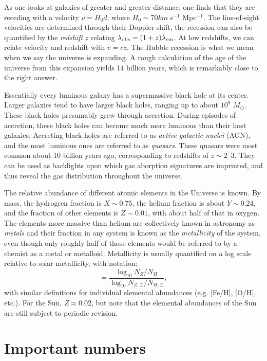 As one looks at galaxies of greater and greater distance, one finds
that they are receding with a velocity $v= H_0d$, where $H_0 \sim 70
km$ s$^{-1}$ Mpc$^{-1}$. The line-of-sight velocities are determined
through their Doppler shift, the recession can also be quantified by
the {\it redshift} $z$ relating $\lambda_{\rm obs} = (1+z)
\lambda_{\rm em}$. At low redshifts, we can relate velocity and
redshift with $v=cz$. The Hubble recession is what we mean when we say
the universe is expanding. A rough calculation of the age of the
universe from this expansion yields 14 billion years, which is
remarkably close to the right answer.

Essentially every luminous galaxy has a supermassive black hole at its
center. Larger galaxies tend to have larger black holes, ranging up to
about $10^9$ $M_\odot$. These black holes presumably grew through
accretion. During episodes of accretion, these black holes can become
much more luminous than their host galaxies. Accreting black holes are
referred to as {\it active galactic nuclei} (AGN), and the most
luminous ones are referred to as {\it quasars}. These quasars were
most common about 10 billion years ago, corresponding to redshifts of
$z\sim 2$--$3$. They can be used as backlights upon which gas
aborption signatures are imprinted, and thus reveal the gas
distribution throughout the universe.

The relative abundance of different atomic elements in the Universe is
known. By mass, the hydrogren fraction is $X \sim 0.75$, the helium
fraction is about $Y \sim 0.24$, and the fraction of other elements is
$Z \sim 0.01$, with about half of that in oxygen. The elements more
massive than helium are collectively known in astronomy as {\it
metals} and their fraction in any system is known as the {\it
metallicity} of the system, even though only roughly half of those
elements would be referred to by a chemist as a metal or
metalloid. Metallicity is usually quantified on a log scale relative
to solar metallicity, with notation:
\begin{equation}
[Z/H] = \frac{\log_{10} N_Z / N_H}{\log_{10} N_{Z, \odot} /
N_{H, \odot}}, 
\end{equation}
with similar definitions for individual elemental abundances
(e.g. [Fe/H], [O/H], etc.). For the Sun, $Z\approx 0.02$, but note
that the elemental abundances of the Sun are still subject to periodic
revision.

\section{Important numbers}

